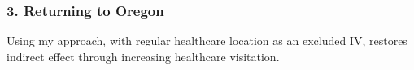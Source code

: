 \documentclass[dvipsnames]{beamer} %
\begin{document}
\begin{frame}
    \frametitle{3. Returning to Oregon}
    Using my approach, with regular healthcare location as an excluded IV, restores indirect effect through increasing healthcare visitation.
    
\end{frame}
\end{document}
